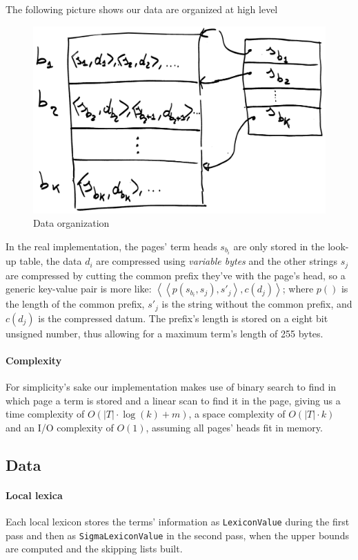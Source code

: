 \documentclass[parskip=full]{report}
\begin{document}
The following picture shows our data are organized at high level

\begin{figure}[H]
	\centering
	\includegraphics[width=0.6\linewidth]{assets/disk_map_base}
	\caption[]{Data organization}
	\label{fig:diskmapbase}
\end{figure}

In the real implementation, the pages' term heads $s_{b_i}$ are only stored in the look-up table, the data $d_i$ are compressed using \textit{variable bytes} and the other strings $s_j$ are compressed by cutting the common prefix they've with the page's head, so a generic key-value pair is more like:
$\left<	\left< p(s_{b_i}, s_j), {s'}_j \right>, c(d_j)	\right>$; where $p()$ is the length of the common prefix, $ {s'}_j$ is the string without the common prefix, and $c(d_j)$ is the compressed datum. The prefix's length is stored on a eight bit unsigned number, thus allowing for a maximum term's length of 255 bytes.

\paragraph{Complexity}
For simplicity's sake our implementation makes use of binary search to find in which page a term is stored and a linear scan to find it in the page, giving us a time complexity of 
$O\left(	|T|\cdot\log(k) + m	\right)$,
a space complexity of
$O\left(	|T|\cdot k	\right)$ and
an I/O complexity of
$O\left(	1	\right)$, assuming all pages' heads fit in memory.

\subsection{Data}

\paragraph{Local lexica}
Each local lexicon stores the terms' information as \texttt{LexiconValue} during the first pass and then as \texttt{SigmaLexiconValue} in the second pass, when the upper bounds are computed and the skipping lists built.
\end{document}
